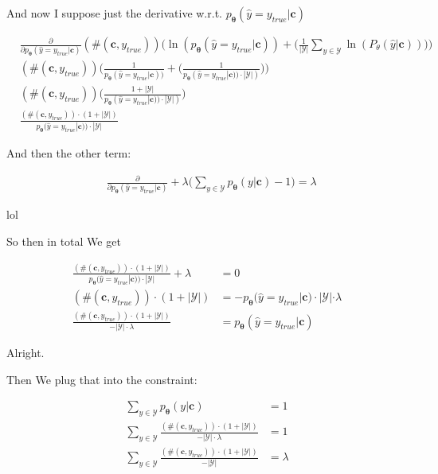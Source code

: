 \documentclass{article}
\newcommand{\vtheta}{\boldsymbol{\theta}}
\newcommand{\model}{p_{\vtheta}}
\newcommand{\context}{\boldsymbol{c}}
\begin{document}
		And now I suppose just the derivative w.r.t. $\model(\hat{y} = y_{true}|\context)$
		
		\begin{align}
			&\frac{\partial}{\partial \model(\hat{y} = y_{true}|\context)} (\#(\context, y_{true}))\bigg(\ln(\model(\hat{y} = y_{true}|\context)) + \bigg(\frac{1}{|\mathcal{Y}|} \sum_{y\in\mathcal{Y}} \ln(P_\theta(\hat{y} | \context) )\bigg)\bigg)\\
			&(\#(\context, y_{true}))\bigg(\frac{1}{\model(\hat{y} = y_{true}|\context))} + \bigg( \frac{1}{\model(\hat{y} = y_{true}|\context)) \cdot |\mathcal{Y}| )}\bigg)\bigg)\\
			&(\#(\context, y_{true})) \bigg( \frac{1 + |\mathcal{Y}|}{\model(\hat{y} = y_{true}|\context)) \cdot |\mathcal{Y}| )}\bigg)\\
			& \frac{(\#(\context, y_{true}))\cdot (1 + |\mathcal{Y}|)}{\model(\hat{y} = y_{true}|\context)) \cdot |\mathcal{Y}|}
		\end{align}
		
		And then the other term:
		
		\begin{align}
			&\frac{\partial}{\partial \model(\hat{y} = y_{true}|\context)} + \lambda\bigg(\sum_{y\in\mathcal{Y}}\model(y|\context) - 1 \bigg) = \lambda
		\end{align}
		
		lol
		
		So then in total We get
		
		\begin{align}
			\frac{(\#(\context, y_{true}))\cdot (1 + |\mathcal{Y}|)}{\model(\hat{y} = y_{true}|\context)) \cdot |\mathcal{Y}|} + \lambda &= 0\\
			(\#(\context, y_{true}))\cdot (1 + |\mathcal{Y}|) &= - \model(\hat{y} = y_{true}|\context) \cdot |\mathcal{Y}|\cdot \lambda \\
			\frac{(\#(\context, y_{true}))\cdot (1 + |\mathcal{Y}|)}{- |\mathcal{Y}|\cdot \lambda 	} &=  \model(\hat{y} = y_{true}|\context) 
		\end{align}
		
		Alright.
		
		Then We plug that into the constraint:
		
		\begin{align}
			\sum_{y\in\mathcal{Y}} \model(y|\context) &= 1\\
			\sum_{y\in\mathcal{Y}} \frac{(\#(\context, y_{true}))\cdot (1 + |\mathcal{Y}|)}{- |\mathcal{Y}|\cdot \lambda } &= 1\\
			\sum_{y\in\mathcal{Y}} \frac{(\#(\context, y_{true}))\cdot (1 + |\mathcal{Y}|)}{- |\mathcal{Y}| } &= \lambda
		\end{align}
		
\end{document}
